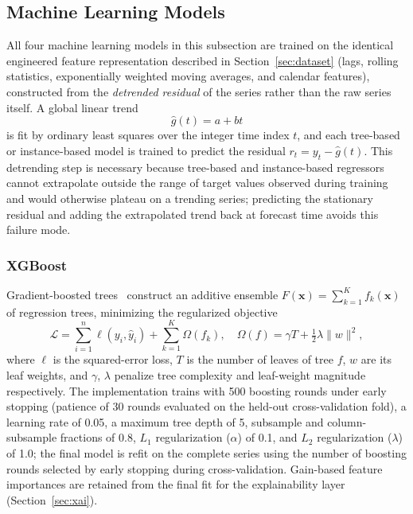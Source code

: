 \subsection{Machine Learning Models}
\label{subsec:ml-models}
All four machine learning models in this subsection are trained on the identical engineered feature representation described in Section~\ref{sec:dataset} (lags, rolling statistics, exponentially weighted moving averages, and calendar features), constructed from the \emph{detrended residual} of the series rather than the raw series itself. A global linear trend
\begin{equation}
\hat{g}(t) = a + bt
\end{equation}
is fit by ordinary least squares over the integer time index $t$, and each tree-based or instance-based model is trained to predict the residual $r_t = y_t - \hat{g}(t)$. This detrending step is necessary because tree-based and instance-based regressors cannot extrapolate outside the range of target values observed during training and would otherwise plateau on a trending series; predicting the stationary residual and adding the extrapolated trend back at forecast time avoids this failure mode.

\subsubsection{XGBoost}
Gradient-boosted trees~\cite{chen2016xgboost} construct an additive ensemble $F(\mathbf{x}) = \sum_{k=1}^{K} f_k(\mathbf{x})$ of regression trees, minimizing the regularized objective
\begin{equation}
\label{eq:xgboost-obj}
\mathcal{L} = \sum_{i=1}^{n} \ell\!\left(y_i, \hat{y}_i\right) + \sum_{k=1}^{K}\Omega(f_k), \quad \Omega(f) = \gamma T + \tfrac{1}{2}\lambda\|w\|^2,
\end{equation}
where $\ell$ is the squared-error loss, $T$ is the number of leaves of tree $f$, $w$ are its leaf weights, and $\gamma$, $\lambda$ penalize tree complexity and leaf-weight magnitude respectively. The implementation trains with 500 boosting rounds under early stopping (patience of 30 rounds evaluated on the held-out cross-validation fold), a learning rate of 0.05, a maximum tree depth of 5, subsample and column-subsample fractions of 0.8, $L_1$ regularization ($\alpha$) of 0.1, and $L_2$ regularization ($\lambda$) of 1.0; the final model is refit on the complete series using the number of boosting rounds selected by early stopping during cross-validation. Gain-based feature importances are retained from the final fit for the explainability layer (Section~\ref{sec:xai}).

